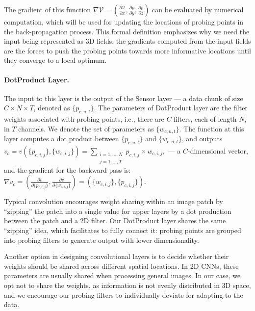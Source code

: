 \documentclass{article}
\begin{document}
The gradient of this function $\nabla \mathcal{V} =(\frac{\partial \mathcal{V}}{\partial x}, \frac{\partial p}{\partial y}, \frac{\partial p}{\partial z})$ can be evaluated by numerical computation, which will be used for updating the locations of probing points in the back-propagation process. This formal definition emphasizes why we need the input being represented as 3D fields: the gradients computed from the input fields are the forces to push the probing points towards more informative locations until they converge to a local optimum.

\paragraph{DotProduct Layer.} The input to this layer is the output of the Sensor layer --- a data chunk of size $C \times N \times T$, denoted as $\{p_{c,n,t}\}$. The parameters of DotProduct layer are the filter weights associated with probing points, i.e., there are $C$ filters, each of length $N$, in $T$ channels. We denote the set of parameters as $\{w_{c,n,t}\}$. The function at this layer computes a dot product between $\{p_{c,n,t}\}$ and $\{w_{c,n,t}\}$, and outputs
$
v_{c} = v(\{p_{c,i,j}\}, \{w_{c,i,j}\}) = \sum_{\substack{
   i=1,...,N \\
   j=1,...,T
  }} p_{c,i,j} \times w_{c,i,j},
$
--- a $C$-dimensional vector, and the gradient for the backward pass is:
$
\nabla v_c =(\frac{\partial v}{\partial \{p_{c,i,j}\}}, \frac{\partial v}{\partial \{w_{c,i,j}\}}) = (\{w_{c,i,j}\}, \{p_{c,i,j}\}).
$

Typical convolution encourages weight sharing within an image patch by ``zipping'' the patch into a single value for upper layers by a dot production between the patch and a 2D filter. Our DotProduct layer shares the same ``zipping'' idea, which facilitates to fully connect it: probing points are grouped into probing filters to generate output with lower dimensionality. 

Another option in designing convolutional layers is to decide whether their weights should be shared across different spatial locations. In 2D CNNs, these parameters are usually shared when processing general images. In our case, we opt not to share the weights, as information is not evenly distributed in 3D space, and we encourage our probing filters to individually deviate for adapting to the data.
\end{document}
